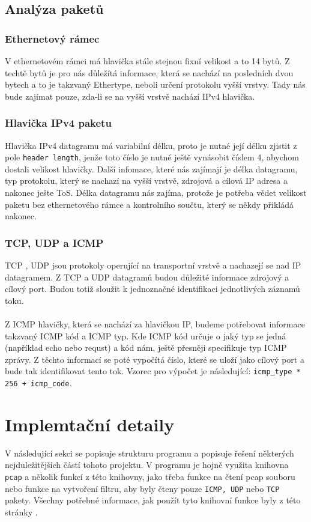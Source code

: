 \documentclass[12pt]{article}
\begin{document}
\subsection{Analýza paketů}

\subsubsection{Ethernetový rámec}
V ethernetovém rámci má hlavička stále stejnou fixní velikost a to 14 bytů. Z techtě bytů je pro nás důležítá informace, která se nachází na posledních dvou bytech
a to je takzvaný Ethertype, neboli určení protokolu vyšší vrstvy. Tady nás bude zajímat pouze, zda-li se na vyšší vrstvě nachází IPv4 hlavička.

\subsubsection{Hlavička IPv4 paketu}
Hlavička IPv4 datagramu \cite{IPV4ICMP} má variabilní délku, proto je nutné její délku zjistit z pole \texttt{header length}, jenže toto číslo je nutné ještě vynásobit číslem 4, abychom dostali velikost hlavičky.
Další infomace, které nás zajímají je délka datagramu, typ protokolu, který se nachazí na vyšší vrstvě, zdrojová a cílová IP adresa a nakonec ješte ToS. 
Délka datagramu nás zajíma, protože je potřeba vědet velikost paketu bez ethernetového rámce a kontrolního součtu, který se někdy přikládá nakonec.

\subsubsection{TCP, UDP a ICMP}
TCP \cite{TCP}, UDP \cite{UDP} jsou protokoly operující na transportní vrstvě a nachazejí se nad IP datagramem. Z TCP a UDP datagramů budou důležité informace zdrojový a cílový port. Budou totiž sloužit k jednoznačné identifikaci jednotlivých záznamů toku.
\\\\
Z ICMP \cite{IPV4ICMP} hlavičky, která se nachází za hlavičkou IP, budeme potřebovat informace takzvaný ICMP kód a ICMP typ. Kde ICMP kód určuje o jaký typ se jedná (například echo nebo requst) a kód nám, ještě přesněji specifikuje typ ICMP zprávy.
Z těchto informací se poté vypočítá číslo, které se uloží jako cílový port a bude tak identifikovat tento tok. Vzorec pro výpočet je následující: \texttt{icmp\_type * 256 + icmp\_code}.

\section{Implemtační detaily}
V následující sekci se popisuje strukturu programu a popisuje řešení některých nejduležitějších částí tohoto projektu.
V programu je hojně využita knihovna \texttt{pcap} a několik funkcí z této knihovny, jako třeba funkce na čtení pcap souboru nebo funkce
na vytvoření filtru, aby byly čteny pouze \texttt{ICMP, UDP} nebo \texttt{TCP} pakety. Všechny potřebné informace, jak použít tyto knihovní funkce byly z této stránky \cite{pcap}. 
\end{document}
